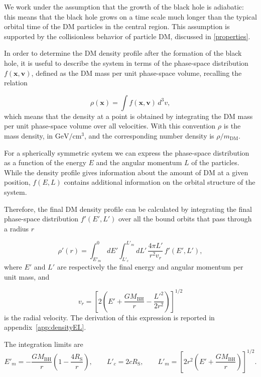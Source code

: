 We work under the assumption that the growth of the
black hole is adiabatic: this means that the black hole grows on a time scale much longer
than the typical orbital time of the DM particles in the central
region. This assumption is supported by
the collisionless behavior of particle DM, discussed in \cref{properties}.

In order to determine the DM density profile after the formation of the black hole, it is useful to describe the system in terms of the phase-space distribution $f(\mathbf{x}, \mathbf{v})$, defined as the DM mass per unit phase-space volume, recalling the relation

\begin{equation}
\rho(\mathbf{x})
=
\int f(\mathbf{x}, \mathbf{v}) \, d^3 v,
\end{equation}
which means that the density at a point is obtained by integrating
the DM mass per unit phase-space volume over all velocities.
With this convention $\rho$ is the mass density, in $\mathrm{GeV/cm^3}$, and the
corresponding number density is $\rho / m_{\mathrm{DM}}$.


For a spherically symmetric system we can express the phase-space distribution as a function of the energy $E$ and the angular momentum $L$ of the particles. While the density profile gives information about the amount of DM at a given position, $f(E,L)$ contains additional information on the orbital
structure of the system.

Therefore, the final DM density profile can be calculated by integrating the final phase-space distribution
$f'(E',L')$ over all the bound orbits that pass through a radius $r$


\begin{equation} \label{eq:density_phase_space}
\rho'(r)
=
\int_{E'_m}^{0} dE'
\int_{L'_c}^{L'_m} dL'\,
\frac{4\pi L'}{r^2 v_r}\,
f'(E',L') ,
\end{equation}
where $E'$ and $L'$ are respectively the final energy and angular momentum per
unit mass, and

\begin{equation}
v_r
=
\left[
2\left(
E' + \frac{GM_{\mathrm{BH}}}{r} - \frac{L'^2}{2r^2}
\right)
\right]^{1/2}
\end{equation}
is the radial velocity. 
The derivation of this expression is reported in appendix~\ref{app:densityEL}.

The integration limits are
\begin{equation}
E'_m
=
-\frac{GM_{\mathrm{BH}}}{r}
\left(
1-\frac{4R_{\mathrm{S}}}{r}
\right),
\qquad
L'_c = 2cR_{\mathrm{S}},
\qquad
L'_m
=
\left[
2r^2
\left(
E' + \frac{GM_{\mathrm{BH}}}{r}
\right)
\right]^{1/2}.
\end{equation}

